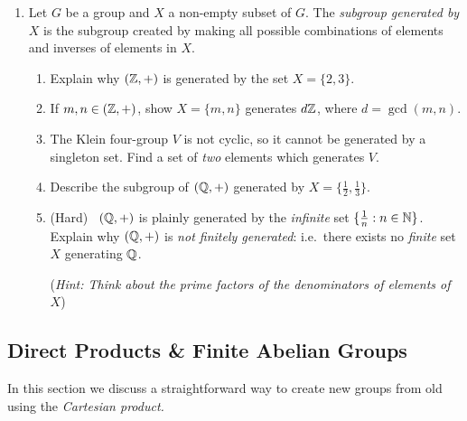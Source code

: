 \begin{exercises}
\begin{enumerate}
		
		\item\label{exs:finitegen} Let $G$ be a group and $X$ a non-empty subset of $G$. The \emph{subgroup generated by $X$} is the subgroup created by making all possible combinations of elements and inverses of elements in $X$.
		\begin{enumerate}
		  \item Explain why $(\mathbb{Z},+)$ is generated by the set $X=\{2,3\}$.
		  \item If $m,n\in(\mathbb{Z},+)$, show $X=\{m,n\}$ generates $d\mathbb{Z}$, where $d=\gcd(m,n)$.
		  \item The Klein four-group $V$ is not cyclic, so it cannot be generated by a singleton set. Find a set of \emph{two} elements which generates $V$.
		  \item Describe the subgroup of $(\mathbb{Q},+)$ generated by $X=\{\frac 12,\frac 13\}$.
		  \item (Hard) \ $(\mathbb{Q},+)$ is plainly generated by the \emph{infinite} set $\{\frac 1n:n\in\mathbb{N}\}$. Explain why $(\mathbb{Q},+)$ is \emph{not finitely generated}: i.e.\ there exists no \emph{finite} set $X$ generating $\mathbb{Q}$.\par
		  (\emph{Hint: Think about the prime factors of the denominators of elements of $X$})
		\end{enumerate}

	
	\end{enumerate}
\end{exercises}



\subsection{Direct Products \& Finite Abelian Groups}\label{sec:direct}


In this section we discuss a straightforward way to create new groups from old using the \emph{Cartesian product.}

